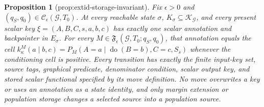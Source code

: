 \documentclass{article}
\newtheorem{proposition}{Proposition}
\begin{document}
\begin{proposition}[prop:extid-storage-invariant]\label{prop:extid-storage-invariant}
Fix \(\epsilon>0\) and \((q_S,q_0)\in\mathcal C_{\epsilon}(\mathcal G,T_0)\). At every reachable state \(\sigma\), \(K_\sigma\subseteq\mathscr K_{\mathcal G}\), and every present scalar key \(\xi=(A,B,C,s,a,b,c)\) has exactly one scalar annotation and backpointer in \(E_\sigma\). For every \(M\in\mathfrak F_{\epsilon}(\mathcal G,T_0;q_S,q_0)\), that annotation equals the cell \(k_\kappa^M(a\mid b,c)=P_M(A=a\mid\operatorname{do}(B=b),C=c,S_s)\) whenever the conditioning cell is positive. Every transition has exactly the finite input-key set, source tags, graphical predicate, denominator condition, scalar output key, and stored scalar functional specified by its move definition. No move overwrites a key or uses an annotation as a state identity, and only margin extension or population storage changes a selected source into a population source.
\end{proposition}
\end{document}
